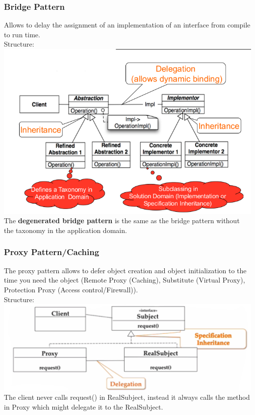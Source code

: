 \subsubsection{Bridge Pattern}
Allows to delay the assignment of an implementation of an interface from compile to run time.\\
Structure:\\
\includegraphics[width=\linewidth]{images/pattern_bridge.png}
The \textbf{degenerated bridge pattern} is the same as the bridge pattern without the taxonomy in the application domain.
\newpage

\subsubsection{Proxy Pattern/Caching}
The proxy pattern allows to defer object creation and object initialization to the time you need the object (Remote Proxy (Caching), Substitute (Virtual Proxy), Protection Proxy (Access control/Firewall)).\\
Structure:\\
\includegraphics[width=\linewidth]{images/pattern_proxy.png}
The client never calls request() in RealSubject, instead it always calls the method in Proxy which might delegate it to the RealSubject.
\newpage


